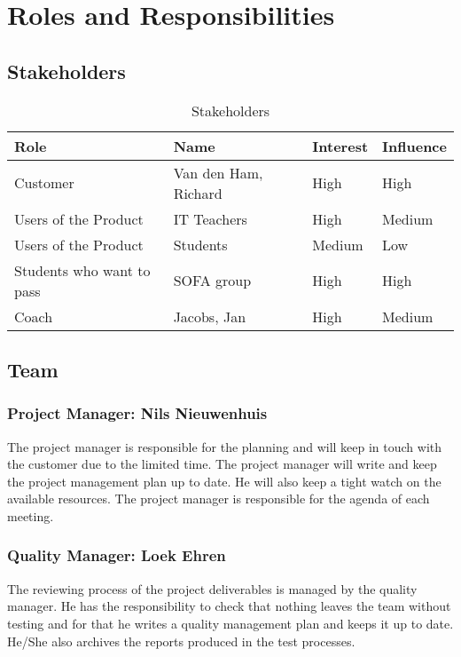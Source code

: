 \section{Roles and Responsibilities}

\subsection{Stakeholders}
\begin{table}[h]
    \begin{tabular}{l|l|l|l}
        \textbf{Role}               &   \textbf{Name}           &   \textbf{Interest}     &     \textbf{Influence}  \\ \hline \hline
        Customer                    &   Van den Ham, Richard    &   High                  &     High                \\ \hline
        Users of the Product        &   IT Teachers             &   High                  &     Medium              \\ \hline
        Users of the Product        &   Students                &   Medium                &     Low                 \\ \hline
        Students who want to pass   &   SOFA group              &   High                  &     High                \\ \hline
        Coach                       &   Jacobs, Jan             &   High                  &     Medium              \\ \hline        
    \end{tabular}
    \caption{Stakeholders}
\end{table}

\subsection{Team}
    \subsubsection{Project Manager: Nils Nieuwenhuis}
    The project manager is responsible for the planning
    and will keep in touch with the customer due to the limited time. The project manager will write and
    keep the project management plan up to date. He will also keep a tight watch on the available
    resources. The project manager is responsible for the agenda of each meeting.

    \subsubsection{Quality Manager: Loek Ehren}
    The reviewing process of the project deliverables is managed by the quality manager. He has the responsibility to check that nothing leaves
    the team without testing and for that he writes a quality management plan and keeps it up to date. He/She also archives the reports produced
    in the test processes. 

